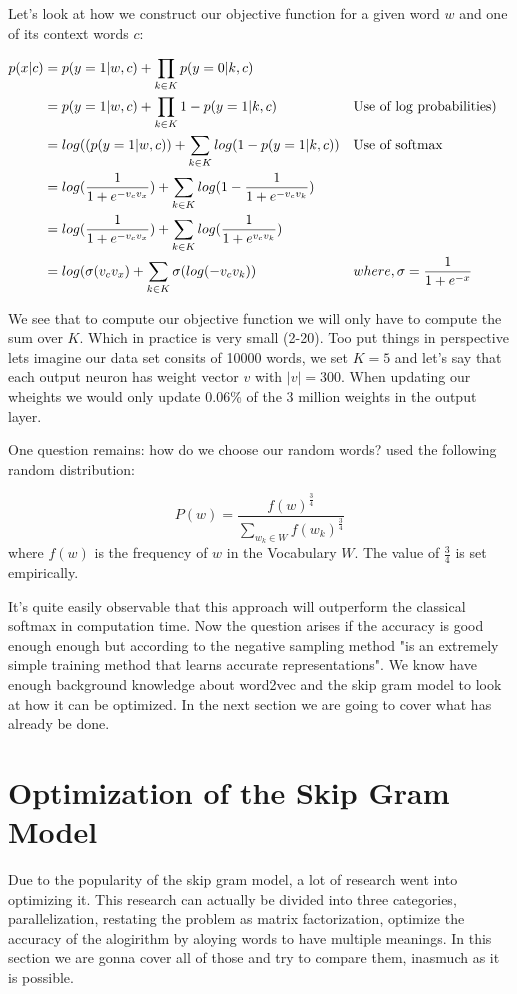 Let's look at how we construct our objective function for a given word $w$ and one of its context words $c$: 

\begin{align*}
p(x|c) &= p(y=1|w,c) + \prod_{k\in K} p(y=0|k,c) 
\\&= p(y=1|w,c) + \prod_{k\in K} 1- p(y=1|k,c) 	&&\text{Use of log probabilities)}
\\&= log((p(y=1|w,c)) + \sum_{k\in K} log(1- p(y=1|k,c)) &&\text{Use of softmax}
\\&=  log(\frac{1}{1+e^{-v_c v_x }})  + \sum_{k\in K} log(1-\frac{1}{1+e^{-v_c v_k}})
\\&=  log(\frac{1}{1+e^{-v_c v_x }})  + \sum_{k\in K} log(\frac{1}{1+e^{v_c v_k }})
\\&= log(\sigma(v_c v_x ) + \sum_{k\in K} \sigma(log(-v_c v_k )) &&\text{$ where, \sigma = \frac{1}{1+e^{-x}}$}
\end{align*}

We see that to compute our objective function we will only have to compute the sum over $K$. Which in practice is very small (2-20). Too put things in perspective lets imagine our data set consits of 10000 words, we set $K=5$ and let's say that each output neuron has weight vector $v$ with $|v| = 300$. When updating our wheights we would only update  0.06\% of the 3 million weights in the output layer. 

One question remains: how do we choose our random words? \cite{mikolov2} used the following random distribution:
 
 \begin{equation}
P(w)=\frac{f(w)^{\frac{3}{4}}}{\sum_{w_k\in W} f(w_k)^{\frac{3}{4}}}
\end{equation}
where $f(w)$ is the frequency of $w$ in the Vocabulary $W$. The value of $\frac{3}{4}$ is set empirically.

It's quite easily observable that this approach will outperform the classical softmax in computation time. Now the question arises if the accuracy is good enough enough but according to \cite{mikolov2} the negative sampling method "is an extremely simple training method that learns accurate representations". 
We know have enough background knowledge about word2vec and the skip gram model to look at how it can be optimized. In the next section we are going to cover what has already be done.

\section{Optimization of the Skip Gram Model}
Due to the popularity of the skip gram model, a lot of research went into optimizing it. This research can actually be divided into three categories, parallelization, restating the problem as matrix factorization, optimize the accuracy of the alogirithm by aloying words to have multiple meanings. In this section we are gonna cover all of those and try to compare them, inasmuch as it is possible.
